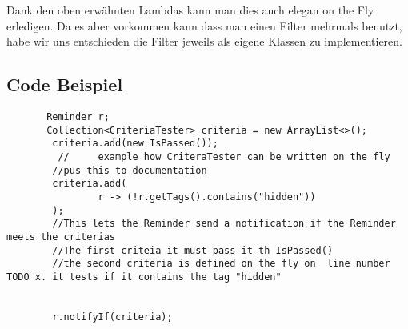   Dank den oben erwähnten Lambdas kann man dies auch elegan on the Fly erledigen. Da es aber vorkommen kann dass man einen Filter mehrmals benutzt, habe wir uns entschieden die Filter jeweils als eigene Klassen zu implementieren.
  \subsection{Code Beispiel}
  
       \begin{lstlisting}
       Reminder r;
       Collection<CriteriaTester> criteria = new ArrayList<>();
        criteria.add(new IsPassed());
         //     example how CriteraTester can be written on the fly
        //pus this to documentation
        criteria.add(
                r -> (!r.getTags().contains("hidden"))
        );
        //This lets the Reminder send a notification if the Reminder meets the criterias 
        //The first criteia it must pass it th IsPassed()
        //the second criteria is defined on the fly on  line number TODO x. it tests if it contains the tag "hidden"
        
     
        r.notifyIf(criteria);

       \end{lstlisting}